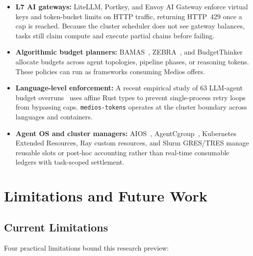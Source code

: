 \documentclass[11pt]{article}
\begin{document}
\begin{itemize}
  \item \textbf{L7 AI gateways:} LiteLLM, Portkey, and Envoy AI Gateway enforce virtual keys and token-bucket limits on HTTP traffic, returning HTTP~429 once a cap is reached. Because the cluster scheduler does not see gateway balances, tasks still claim compute and execute partial chains before failing.
  \item \textbf{Algorithmic budget planners:} BAMAS~\cite{yang2025bamas}, ZEBRA~\cite{hamri2026zebra}, and BudgetThinker~\cite{budgetthinker2025} allocate budgets across agent topologies, pipeline phases, or reasoning tokens. These policies can run as frameworks consuming Medios offers.
  \item \textbf{Language-level enforcement:} A recent empirical study of 63 LLM-agent budget overruns~\cite{tokenbudgets2026} uses affine Rust types to prevent single-process retry loops from bypassing caps. \texttt{medios-tokens} operates at the cluster boundary across languages and containers.
  \item \textbf{Agent OS and cluster managers:} AIOS~\cite{mei2024aios}, AgentCgroup~\cite{agentcgroup2025}, Kubernetes Extended Resources, Ray custom resources, and Slurm GRES/TRES manage reusable slots or post-hoc accounting rather than real-time consumable ledgers with task-scoped settlement.
\end{itemize}

\section{Limitations and Future Work}
\label{sec:limits}

\subsection{Current Limitations}
Four practical limitations bound this research preview:
\end{document}
